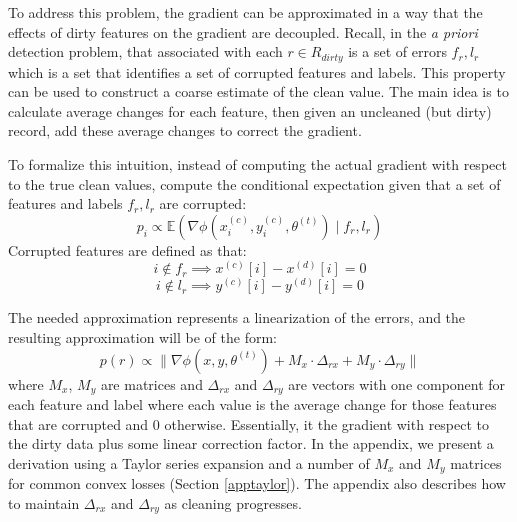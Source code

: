 To address this problem, the gradient can be approximated in a way that the effects of dirty features on the gradient are decoupled.
Recall, in the \emph{a priori} detection problem, that associated with each $r \in R_{dirty}$ is a set of errors $f_r,l_r$ which is a set that identifies a set of corrupted features and labels.
This property can be used to construct a coarse estimate of the clean value.
The main idea is to calculate average changes for each feature, then given an uncleaned (but dirty) record, add these average changes to correct the gradient.

To formalize this intuition, instead of computing the actual gradient with respect to the 
true clean values, compute the conditional expectation given that a set of features and labels $f_r,l_r$ are corrupted:
\[
p_i \propto \mathbb{E}(\nabla\phi(x^{(c)}_i,y^{(c)}_i,\theta^{(t)}) \mid f_r,l_r)
\]
Corrupted features are defined as that:
\[
i \notin f_r \implies x^{(c)}[i] - x^{(d)}[i] = 0
\]
\[
i \notin l_r \implies y^{(c)}[i] - y^{(d)}[i] = 0
\]

The needed approximation represents a linearization of the errors, and the resulting approximation will be of the form:
\[
p(r)\propto\|\nabla\phi(x,y,\theta^{(t)}) + M_x \cdot \Delta_{rx} +  M_y \cdot \Delta_{ry}\|
\]
where $M_x$, $M_y$ are matrices and $\Delta_{rx}$ and $\Delta_{ry}$ are vectors with one component for each feature and label where each value is the average change for those features that are corrupted and 0 otherwise.
Essentially, it the gradient with respect to the dirty data plus some linear correction factor.
In the appendix, we present a derivation using a Taylor series expansion and a number of $M_x$ and $M_y$ matrices for common convex losses (Section \ref{apptaylor}).
The appendix also describes how to maintain $\Delta_{rx}$ and $\Delta_{ry}$ as cleaning progresses.

\iffalse
\paragraph{More Accurate Early Error Estimates}\label{acc}
Linearization over avoids amplifying estimation error.
Consider the linear regression gradient:
\[
\nabla\phi(x,y,\theta) = (\theta^Tx - y)x
\]
This can be rewritten as a vector in each component:
\[
g[i] = \sum_{i} x[i]^2-x[i]y + \sum_{j \ne i} \theta[j]x[j]
\]
This function is already mostly linear in $x$ except for the one quadratic term.
However, this one quadratic term has potential to amplify errors.
Consider two expressions:
\[
f(x+\epsilon) = (x+\epsilon)^2 = x^2 + 2x\epsilon + \epsilon^2
\]
\[
f(x+\epsilon) \approx f(x) + f'(x)(\epsilon) = x^2 + 2x\epsilon
\]
The only difference between the two estimates is the quadratic $\epsilon^2$, if $\epsilon$ is highly uncertain random variable then the quadratic dominates.
If this variance is large, the Taylor estimate avoids amplifying this error.
Of course, this is at the tradeoff of some additional bias since the true function is non-linear.
We evaluate this linearization in Section \ref{est} against alternatives, and find that indeed it provides more accurate estimates for a small number of samples cleaned.
When the number of cleaned samples is large the alternative techniques are comparable or even slightly better.
\fi

